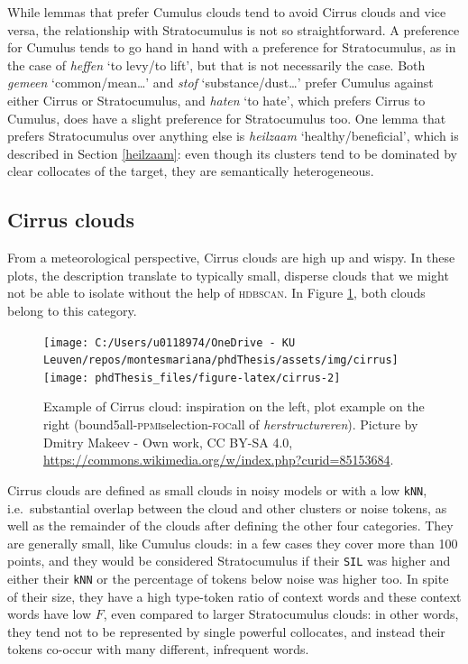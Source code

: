 \documentclass[
]{book}
\begin{document}
While lemmas that prefer Cumulus clouds tend to avoid Cirrus clouds and vice versa, the relationship with Stratocumulus is not so straightforward. A preference for Cumulus tends to go hand in hand with a preference for Stratocumulus, as in the case of \emph{heffen} `to levy/to lift', but that is not necessarily the case. Both \emph{gemeen} `common/mean\ldots{}' and \emph{stof} `substance/dust\ldots{}' prefer Cumulus against either Cirrus or Stratocumulus, and \emph{haten} `to hate', which prefers Cirrus to Cumulus, does have a slight preference for Stratocumulus too. One lemma that prefers Stratocumulus over anything else is \emph{heilzaam} `healthy/beneficial', which is described in Section \ref{heilzaam}: even though its clusters tend to be dominated by clear collocates of the target, they are semantically heterogeneous.

\hypertarget{cirrus-clouds}{%
\subsection{Cirrus clouds}\label{cirrus-clouds}}

From a meteorological perspective, Cirrus clouds are high up and wispy. In these plots, the description translate to typically small, disperse clouds that we might not be able to isolate without the help of \textsc{hdbscan}. In Figure \ref{fig:cirrus}, both clouds belong to this category.



\begin{figure}
\texttt{[image: C:/Users/u0118974/OneDrive - KU Leuven/repos/montesmariana/phdThesis/assets/img/cirrus]} \texttt{[image: phdThesis\_files/figure-latex/cirrus-2]} \caption{Example of Cirrus cloud: inspiration on the left, plot example on the right (bound5all-\textsc{ppmi}selection-\textsc{foc}all of \emph{herstructureren}). Picture by Dmitry Makeev - Own work, CC BY-SA 4.0, \url{https://commons.wikimedia.org/w/index.php?curid=85153684}.}\label{fig:cirrus}
\end{figure}

Cirrus clouds are defined as small clouds in noisy models or with a low \texttt{kNN}, i.e.~substantial overlap between the cloud and other clusters or noise tokens, as well as the remainder of the clouds after defining the other four categories.
They are generally small, like Cumulus clouds: in a few cases they cover more than 100 points, and they would be considered Stratocumulus if their \texttt{SIL} was higher and either their \texttt{kNN} or the percentage of tokens below noise was higher too.
In spite of their size, they have a high type-token ratio of context words and these context words have low \(F\), even compared to larger Stratocumulus clouds: in other words, they tend not to be represented by single powerful collocates, and instead their tokens co-occur with many different, infrequent words.
\end{document}
